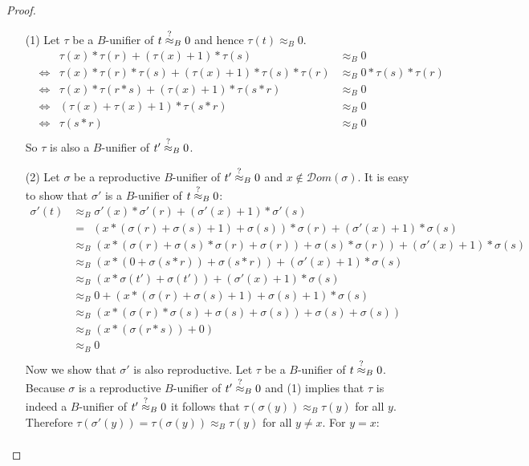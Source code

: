 		\begin{proof}\mbox{}
		\begin{itemize}
		\item[(1)] Let $\tau$ be a $B$-unifier of $t\stackrel{?}{\approx}_B0$ and hence $\tau(t)\approx_B0$.
		\begin{align*}
		&&\tau(x)*\tau(r)+(\tau(x)+1)*\tau(s)&\approx_B0\\
		&\iff&\tau(x)*\tau(r)*\tau(s)+(\tau(x)+1)*\tau(s)*\tau(r)&\approx_B0*\tau(s)*\tau(r)\\
		&\iff&\tau(x)*\tau(r*s)+(\tau(x)+1)*\tau(s*r)&\approx_B0\\
		&\iff&(\tau(x)+\tau(x)+1)*\tau(s*r)&\approx_B0\\
		&\iff&\tau(s*r)&\approx_B0\\
		\end{align*}
		So $\tau$ is also a $B$-unifier of $t'\stackrel{?}{\approx}_B0$.
		\item[(2)] Let $\sigma$ be a reproductive $B$-unifier of $t'\stackrel{?}{\approx}_B0$ and $x\notin\mathcal{D}om(\sigma)$. It is easy to show that $\sigma'$ is a $B$-unifier of $t\stackrel{?}{\approx}_B0$:
		\begin{align*}
		\sigma'(t)&\approx_B\sigma'(x)*\sigma'(r)+(\sigma'(x)+1)*\sigma'(s)\\
		&=\ \ (x*(\sigma(r)+\sigma(s)+1)+\sigma(s))*\sigma(r)+(\sigma'(x)+1)*\sigma(s)\\
		&\approx_B(x*(\sigma(r)+\sigma(s)*\sigma(r)+\sigma(r))+\sigma(s)*\sigma(r))+(\sigma'(x)+1)*\sigma(s)\\
		&\approx_B(x*(0+\sigma(s*r))+\sigma(s*r))+(\sigma'(x)+1)*\sigma(s)\\
		&\approx_B(x*\sigma(t')+\sigma(t'))+(\sigma'(x)+1)*\sigma(s)\\
		&\approx_B0+(x*(\sigma(r)+\sigma(s)+1)+\sigma(s)+1)*\sigma(s)\\
		&\approx_B(x*(\sigma(r)*\sigma(s)+\sigma(s)+\sigma(s))+\sigma(s)+\sigma(s))\\
		&\approx_B(x*(\sigma(r*s))+0)\\
		&\approx_B0\\
		\end{align*}
		Now we show that $\sigma'$ is also reproductive. Let $\tau$ be a $B$-unifier of $t\stackrel{?}{\approx}_B0$. Because $\sigma$ is a reproductive $B$-unifier of $t'\stackrel{?}{\approx}_B0$ and (1) implies that $\tau$ is indeed a $B$-unifier of $t'\stackrel{?}{\approx}_B0$ it follows that $\tau(\sigma(y))\approx_B\tau(y)$ for all $y$. Therefore $\tau(\sigma'(y))=\tau(\sigma(y))\approx_B\tau(y)$ for all $y\neq x$. For $y=x$:
		\begin{align*}

\end{align*}
\end{itemize}
\end{proof}
